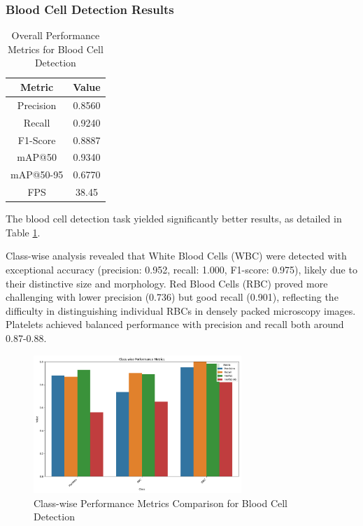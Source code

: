 \subsubsection{Blood Cell Detection Results}

\begin{table}[ht]
\centering
\begin{tabular}{|c|c|}
\hline
\textbf{Metric} & \textbf{Value} \\
\hline
Precision & 0.8560 \\
Recall & 0.9240 \\
F1-Score & 0.8887 \\
mAP@50 & 0.9340 \\
mAP@50-95 & 0.6770 \\
FPS & 38.45 \\
\hline
\end{tabular}
\caption{Overall Performance Metrics for Blood Cell Detection}
\label{tab:blood_cell_results}
\end{table}

\begin{multicols}{2}
The blood cell detection task yielded significantly better results, as detailed in Table \ref{tab:blood_cell_results}.

Class-wise analysis revealed that White Blood Cells (WBC) were detected with exceptional accuracy (precision: 0.952, recall: 1.000, F1-score: 0.975), likely due to their distinctive size and morphology. Red Blood Cells (RBC) proved more challenging with lower precision (0.736) but good recall (0.901), reflecting the difficulty in distinguishing individual RBCs in densely packed microscopy images. Platelets achieved balanced performance with precision and recall both around 0.87-0.88.
\end{multicols}

\begin{figure}[ht]
\centering
\includegraphics[width=0.7\textwidth]{datas/blood_cell_summary_datas/blood_cells_class_metrics.png}
\caption{Class-wise Performance Metrics Comparison for Blood Cell Detection}
\label{fig:blood_cell_class_metrics}
\end{figure}

